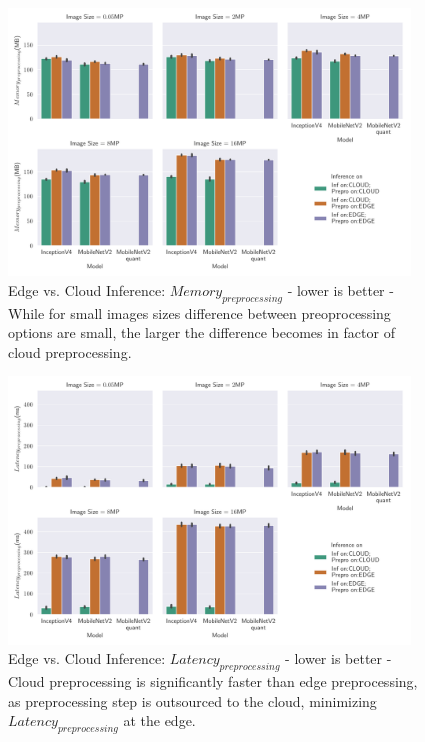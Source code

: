\begin{figure}[!htb]
\centering
\includegraphics[width=0.95\textwidth]{./Bilder/single_plots/edge_vs_cloud_plots/Edge_vs_Cloud_Inference_Preprocessing_Memory.pdf}
\caption[Edge vs. Cloud Inference:  $Memory_{preprocessing}$ - lower is better]{Edge vs. Cloud Inference:  $Memory_{preprocessing}$ - lower is better -
While for small images sizes difference between preoprocessing options are small, the larger the difference becomes in factor of cloud preprocessing.}
\label{fig:EdgeVsCloudPreproMemory}
\end{figure}

\begin{figure}[!htb]
\centering
\includegraphics[width=0.95\textwidth]{./Bilder/single_plots/edge_vs_cloud_plots/Edge_vs_Cloud_Inference_Preprocessing_Latencies.pdf}
\caption[Edge vs. Cloud Inference:  $Latency_{preprocessing}$ - lower is better]{Edge vs. Cloud Inference:  $Latency_{preprocessing}$ - lower is better - Cloud preprocessing is significantly faster than edge preprocessing, as preprocessing step is outsourced to the cloud, minimizing $Latency_{preprocessing}$ at the edge.}
\label{fig:EdgeVsCloudPreproLat}
\end{figure}

